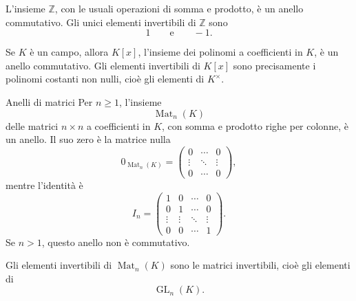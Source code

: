 \documentclass[a4paper]{article}
\begin{document}
\begin{radioactive}
\begin{snippetexample}{}
    L'insieme \(\mathbb{Z}\), con le usuali operazioni di somma e prodotto, è un anello commutativo.
    Gli unici elementi invertibili di \(\mathbb{Z}\) sono
    \[
        1
        \qquad
        \text{e}
        \qquad
        -1.
    \]
\end{snippetexample}
\end{radioactive}

\begin{radioactive}
\begin{snippetexample}{}
    Se \(K\) è un campo, allora \(K[x]\), l'insieme dei polinomi a coefficienti in \(K\), è un anello commutativo.
    Gli elementi invertibili di \(K[x]\) sono precisamente i polinomi costanti non nulli, cioè gli elementi di \(K^\times\).
\end{snippetexample}
\end{radioactive}

\begin{radioactive}
\begin{snippetexample}{Anelli di matrici}
    Per \(n \geq 1\), l'insieme
    \[
        \operatorname{Mat}_n(K)
    \]
    delle matrici \(n \times n\) a coefficienti in \(K\), con somma e prodotto righe per colonne, è un anello.
    Il suo zero è la matrice nulla
    \[
        0_{\operatorname{Mat}_n(K)}
        =
        \begin{pmatrix}
            0 & \cdots & 0 \\
            \vdots & \ddots & \vdots \\
            0 & \cdots & 0
        \end{pmatrix},
    \]
    mentre l'identità è
    \[
        I_n
        =
        \begin{pmatrix}
            1 & 0 & \cdots & 0 \\
            0 & 1 & \cdots & 0 \\
            \vdots & \vdots & \ddots & \vdots \\
            0 & 0 & \cdots & 1
        \end{pmatrix}.
    \]
    Se \(n>1\), questo anello non è commutativo.

    Gli elementi invertibili di \(\operatorname{Mat}_n(K)\) sono le matrici invertibili, cioè gli elementi di
    \[
        \operatorname{GL}_n(K).
    \]
\end{snippetexample}
\end{radioactive}
\end{document}
